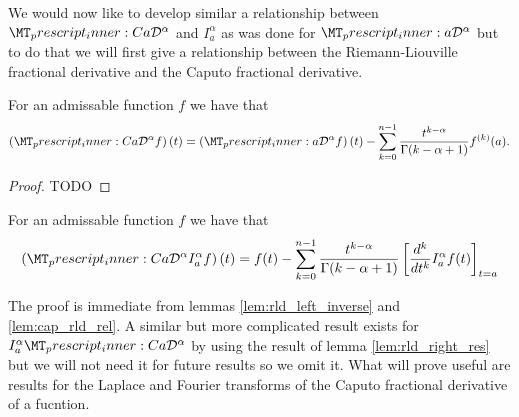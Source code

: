 We would now like to develop similar a relationship between $ \prescript{C}{a}{\mathcal{D}}^\alpha $ and $ I_a^\alpha $ as was done for $ \prescript{}{a}{\mathcal{D}}^\alpha $ but to do that we will first give a relationship between the Riemann-Liouville fractional derivative and the Caputo fractional derivative.

\begin{lemma}
    \label{lem:cap_rld_rel}
    For an admissable function $ f $ we have that
    \begin{align}
        \left(\prescript{C}{a}{\mathcal{D}}^\alpha f\right)(t) = \left( \prescript{}{a}{\mathcal{D}}^\alpha f \right)(t) - \sum_{k=0}^{n-1} \frac{t^{k-\alpha}}{\Gamma(k - \alpha + 1)}f^{(k)}(a).
    \end{align}
\end{lemma}
\begin{proof}
    TODO
\end{proof}

\begin{lemma}
    For an admissable function $ f $ we have that
    \begin{align}
        \left(\prescript{C}{a}{\mathcal{D}}^\alpha I_a^\alpha f\right)(t) = f(t) - \sum_{k=0}^{n-1} \frac{t^{k-\alpha}}{\Gamma(k-\alpha+1)} \left[\frac{d^k}{dt^k}I_a^\alpha f(t) \right]_{t=a}
    \end{align}
\end{lemma}
The proof is immediate from lemmas \ref{lem:rld_left_inverse} and \ref{lem:cap_rld_rel}.
A similar but more complicated result exists for $  I_a^\alpha \prescript{C}{a}{\mathcal{D}}^\alpha $ by using the result of lemma \ref{lem:rld_right_res} but we will not need it for future results so we omit it. What will prove useful are results for the Laplace and Fourier transforms of the Caputo fractional derivative of a fucntion.

